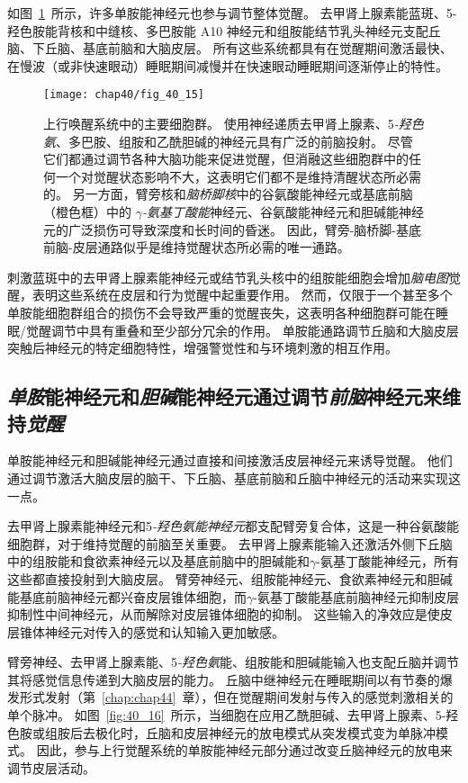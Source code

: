 如图~\ref{fig:40_15}~所示，许多单胺能神经元也参与调节整体觉醒。
去甲肾上腺素能蓝斑、5-羟色胺能背核和中缝核、多巴胺能 A10 神经元和组胺能结节乳头神经元支配丘脑、下丘脑、基底前脑和大脑皮层。
所有这些系统都具有在觉醒期间激活最快、在慢波（或非快速眼动）睡眠期间减慢并在快速眼动睡眠期间逐渐停止的特性。


\begin{figure}[htbp]
	\centering
	\texttt{[image: chap40/fig\_40\_15]}
	\caption{上行唤醒系统中的主要细胞群。
		使用神经递质去甲肾上腺素、5\textit{-羟色氨}、多巴胺、组胺和乙酰胆碱的神经元具有广泛的前脑投射。
		尽管它们都通过调节各种大脑功能来促进觉醒，但消融这些细胞群中的任何一个对觉醒状态影响不大，这表明它们都不是维持清醒状态所必需的。
		另一方面，臂旁核和\textit{脑桥脚核}中的谷氨酸能神经元或基底前脑（橙色框）中的 \textit{$\gamma$-氨基丁酸能}神经元、谷氨酸能神经元和胆碱能神经元的广泛损伤可导致深度和长时间的昏迷。
		因此，臂旁-脑桥脚-基底前脑-皮层通路似乎是维持觉醒状态所必需的唯一通路。}
	\label{fig:40_15}
\end{figure}


刺激蓝斑中的去甲肾上腺素能神经元或结节乳头核中的组胺能细胞会增加\textit{脑电图}觉醒，表明这些系统在皮层和行为觉醒中起重要作用。
然而，仅限于一个甚至多个单胺能细胞群组合的损伤不会导致严重的觉醒丧失，这表明各种细胞群可能在睡眠/觉醒调节中具有重叠和至少部分冗余的作用。
单胺能通路调节丘脑和大脑皮层突触后神经元的特定细胞特性，增强警觉性和与环境刺激的相互作用。



\subsection{\textit{单胺}能神经元和\textit{胆碱}能神经元通过调节\textit{前脑}神经元来维持\textit{觉醒}}

单胺能神经元和胆碱能神经元通过直接和间接激活皮层神经元来诱导觉醒。
他们通过调节激活大脑皮层的脑干、下丘脑、基底前脑和丘脑中神经元的活动来实现这一点。


去甲肾上腺素能神经元和5\textit{-羟色氨能神经元}都支配臂旁复合体，这是一种谷氨酸能细胞群，对于维持觉醒的前脑至关重要。
去甲肾上腺素能输入还激活外侧下丘脑中的组胺能和食欲素神经元以及基底前脑中的胆碱能和$\gamma$-氨基丁酸能神经元，所有这些都直接投射到大脑皮层。
臂旁神经元、组胺能神经元、食欲素神经元和胆碱能基底前脑神经元都兴奋皮层锥体细胞，而$\gamma$-氨基丁酸能基底前脑神经元抑制皮层抑制性中间神经元，从而解除对皮层锥体细胞的抑制。
这些输入的净效应是使皮层锥体神经元对传入的感觉和认知输入更加敏感。


臂旁神经、去甲肾上腺素能、5\textit{-羟色氨}能、组胺能和胆碱能输入也支配丘脑并调节其将感觉信息传递到大脑皮层的能力。
丘脑中继神经元在睡眠期间以有节奏的爆发形式发射（第~\ref{chap:chap44}~章），但在觉醒期间发射与传入的感觉刺激相关的单个脉冲。
如图~\ref{fig:40_16}~所示，当细胞在应用乙酰胆碱、去甲肾上腺素、5-羟色胺或组胺后去极化时，丘脑和皮层神经元的放电模式从突发模式变为单脉冲模式。
因此，参与上行觉醒系统的单胺能神经元部分通过改变丘脑神经元的放电来调节皮层活动。



